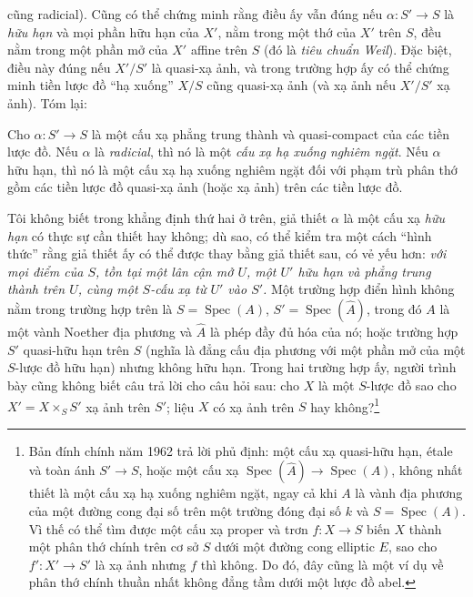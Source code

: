 cũng radicial). Cũng có thể chứng minh rằng điều ấy vẫn đúng nếu
$\alpha:S'\longrightarrow S$ là \emph{hữu hạn} và mọi phần hữu hạn của $X'$,
nằm trong một thớ của $X'$ trên $S$, đều nằm trong một phần mở của $X'$ affine
trên $S$ (đó là \emph{tiêu chuẩn Weil}). Đặc biệt, điều này đúng nếu $X'/S'$ là
quasi-xạ ảnh, và trong trường hợp ấy có thể chứng minh tiền lược đồ ``hạ xuống''
$X/S$ cũng quasi-xạ ảnh (và xạ ảnh nếu $X'/S'$ xạ ảnh). Tóm lại:

 Cho $\alpha:S'\longrightarrow S$ là một cấu xạ phẳng trung
thành và quasi-compact của các tiền lược đồ. Nếu $\alpha$ là \emph{radicial},
thì nó là một \emph{cấu xạ hạ xuống nghiêm ngặt}. Nếu $\alpha$ hữu hạn, thì nó
là một cấu xạ hạ xuống nghiêm ngặt đối với phạm trù phân thớ gồm các tiền lược
đồ quasi-xạ ảnh (hoặc xạ ảnh) trên các tiền lược đồ.

 Tôi không biết trong khẳng định thứ hai ở trên, giả thiết
$\alpha$ là một cấu xạ \emph{hữu hạn} có thực sự cần thiết hay không; dù sao,
có thể kiểm tra một cách ``hình thức'' rằng giả thiết ấy có thể được thay bằng
giả thiết sau, có vẻ yếu hơn: \emph{với mọi điểm của $S$, tồn tại một lân cận
mở $U$, một $U'$ hữu hạn và phẳng trung thành trên $U$, cùng một $S$-cấu xạ từ
$U'$ vào $S'$.} Một trường hợp điển hình không nằm trong trường hợp trên là
$S=\operatorname{Spec}(A)$, $S'=\operatorname{Spec}(\widehat A)$, trong đó $A$
là một vành Noether địa phương và $\widehat A$ là phép đầy đủ hóa của nó; hoặc
trường hợp $S'$ quasi-hữu hạn trên $S$ (nghĩa là đẳng cấu địa phương với một
phần mở của một $S$-lược đồ hữu hạn) nhưng không hữu hạn. Trong hai trường hợp
ấy, người trình bày cũng không biết câu trả lời cho câu hỏi sau: cho $X$ là một
$S$-lược đồ sao cho $X'=X\times_SS'$ xạ ảnh trên $S'$; liệu $X$ có xạ ảnh trên
$S$ hay không?\footnote{Bản đính chính năm 1962 trả lời phủ định: một cấu xạ
quasi-hữu hạn, étale và toàn ánh $S'\longrightarrow S$, hoặc một cấu xạ
$\operatorname{Spec}(\widehat A)\longrightarrow\operatorname{Spec}(A)$, không
nhất thiết là một cấu xạ hạ xuống nghiêm ngặt, ngay cả khi $A$ là vành địa
phương của một đường cong đại số trên một trường đóng đại số $k$ và
$S=\operatorname{Spec}(A)$. Vì thế có thể tìm được một cấu xạ proper và trơn
$f:X\longrightarrow S$ biến $X$ thành một phân thớ chính trên cơ sở $S$ dưới
một đường cong elliptic $E$, sao cho $f':X'\longrightarrow S'$ là xạ ảnh nhưng
$f$ thì không. Do đó, đây cũng là một ví dụ về phân thớ chính thuần nhất không
đẳng tầm dưới một lược đồ abel.}

